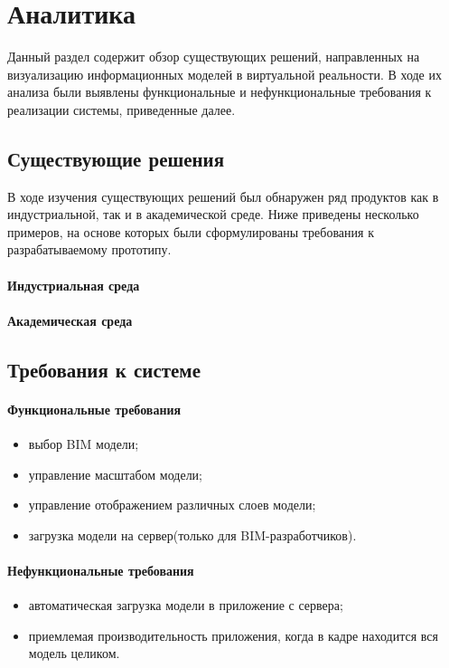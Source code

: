 ﻿\section{Аналитика}

Данный раздел содержит обзор существующих решений,
направленных на визуализацию информационных моделей в виртуальной реальности.
В ходе их анализа были выявлены функциональные и нефункциональные требования
к реализации системы, приведенные далее. 

\subsection{Существующие решения}
В ходе изучения существующих решений был обнаружен ряд продуктов
как в индустриальной, так и в академической среде.
Ниже приведены несколько примеров,
на основе которых были сформулированы требования к разрабатываемому прототипу.

\paragraph{Индустриальная среда}

\lipsum[2][1-3]
\cite{UnityReflect}

\lipsum[4][1-4]
\cite{IrisVR}

\lipsum[3][1-4]
\cite{Enscape}

\paragraph{Академическая среда}

\lipsum[5][1-4]
\cite{Davidson2019}

\lipsum[6][1-4]
\cite{PourRahimian2019}


\subsection{Требования к системе}
\paragraph{Функциональные требования}
\begin{itemize}
    \item выбор BIM модели;
    \item управление масштабом модели;
    \item управление отображением различных слоев модели;
    \item загрузка модели на сервер(только для BIM-разработчиков).
\end{itemize}

\paragraph{Нефункциональные требования}
\begin{itemize}
    \item автоматическая загрузка модели в приложение с сервера;
    \item приемлемая производительность приложения, когда в кадре находится вся модель целиком.
\end{itemize}